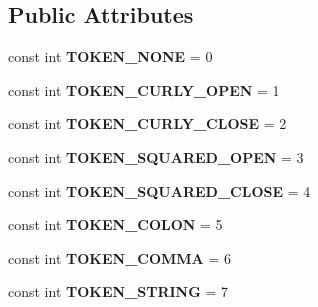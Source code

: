 \subsection*{Public Attributes}
\begin{DoxyCompactItemize}
\item 
\hypertarget{classProcurios_1_1Public_1_1JSON_af7c99e6bcc6e07c3fcceb1271f79f382}{const int {\bfseries T\-O\-K\-E\-N\-\_\-\-N\-O\-N\-E} = 0}\label{classProcurios_1_1Public_1_1JSON_af7c99e6bcc6e07c3fcceb1271f79f382}

\item 
\hypertarget{classProcurios_1_1Public_1_1JSON_aa3c331c741e9b07d0449cd3d693e1713}{const int {\bfseries T\-O\-K\-E\-N\-\_\-\-C\-U\-R\-L\-Y\-\_\-\-O\-P\-E\-N} = 1}\label{classProcurios_1_1Public_1_1JSON_aa3c331c741e9b07d0449cd3d693e1713}

\item 
\hypertarget{classProcurios_1_1Public_1_1JSON_af32234ab5b100343e0c6d09e93170ffc}{const int {\bfseries T\-O\-K\-E\-N\-\_\-\-C\-U\-R\-L\-Y\-\_\-\-C\-L\-O\-S\-E} = 2}\label{classProcurios_1_1Public_1_1JSON_af32234ab5b100343e0c6d09e93170ffc}

\item 
\hypertarget{classProcurios_1_1Public_1_1JSON_ae09402645e8eacd35ce053eafd576b61}{const int {\bfseries T\-O\-K\-E\-N\-\_\-\-S\-Q\-U\-A\-R\-E\-D\-\_\-\-O\-P\-E\-N} = 3}\label{classProcurios_1_1Public_1_1JSON_ae09402645e8eacd35ce053eafd576b61}

\item 
\hypertarget{classProcurios_1_1Public_1_1JSON_af5ab190a671a78c7174ac2605333bff3}{const int {\bfseries T\-O\-K\-E\-N\-\_\-\-S\-Q\-U\-A\-R\-E\-D\-\_\-\-C\-L\-O\-S\-E} = 4}\label{classProcurios_1_1Public_1_1JSON_af5ab190a671a78c7174ac2605333bff3}

\item 
\hypertarget{classProcurios_1_1Public_1_1JSON_ab68ed1d0266e58b25aca047c787ca03a}{const int {\bfseries T\-O\-K\-E\-N\-\_\-\-C\-O\-L\-O\-N} = 5}\label{classProcurios_1_1Public_1_1JSON_ab68ed1d0266e58b25aca047c787ca03a}

\item 
\hypertarget{classProcurios_1_1Public_1_1JSON_a7e32ab85eea665624a0495581e48e467}{const int {\bfseries T\-O\-K\-E\-N\-\_\-\-C\-O\-M\-M\-A} = 6}\label{classProcurios_1_1Public_1_1JSON_a7e32ab85eea665624a0495581e48e467}

\item 
\hypertarget{classProcurios_1_1Public_1_1JSON_a1830251b442ff565dce2f972225caee3}{const int {\bfseries T\-O\-K\-E\-N\-\_\-\-S\-T\-R\-I\-N\-G} = 7}\label{classProcurios_1_1Public_1_1JSON_a1830251b442ff565dce2f972225caee3}


\end{DoxyCompactItemize}
